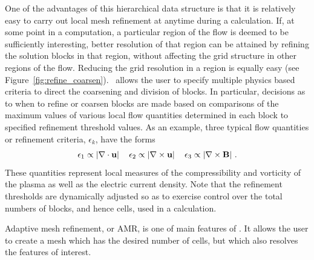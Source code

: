 One of the advantages of this hierarchical data structure is that it
is relatively easy to carry out local mesh refinement at anytime during a
calculation.  If, at some point in a computation, a particular region of the
flow is deemed to be sufficiently interesting, better resolution of that region
can be attained by refining the solution blocks in that region, without
affecting the grid structure in other regions of the flow. Reducing the grid
resolution in a region is equally easy (see Figure~\ref{fig:refine_coarsen}). 
\BATSRUS\ allows the user to specify multiple physics based criteria 
to direct the coarsening and division of blocks. In particular,
decisions as to when to refine or coarsen blocks
are made based on comparisons of the maximum values of various local flow
quantities determined in each block to specified refinement threshold values.
As an example, three typical flow quantities or refinement criteria, $\epsilon_k$,
have the forms
\begin{equation} \label{eq:refine.criteria}
\epsilon_1 \propto \left| {\bf \nabla} \cdot  \mbox{\bf u}
\right| \quad				      
\epsilon_2 \propto \left| {\bf \nabla} \times \mbox{\bf u}
\right| \quad				      
\epsilon_3 \propto \left| {\bf \nabla} \times \mbox{\bf B}
\right| \,.
\end{equation}
These quantities represent local measures of the compressibility and vorticity
of the plasma as well as the electric current density.
Note that the refinement thresholds are
dynamically adjusted so as to exercise control over the total numbers of
blocks, and hence cells, used in a calculation.

Adaptive mesh refinement, or AMR, is one of main features of \BATSRUS.  It allows
the user to create a mesh which has the desired number of cells, but which also
resolves the features of interest.

